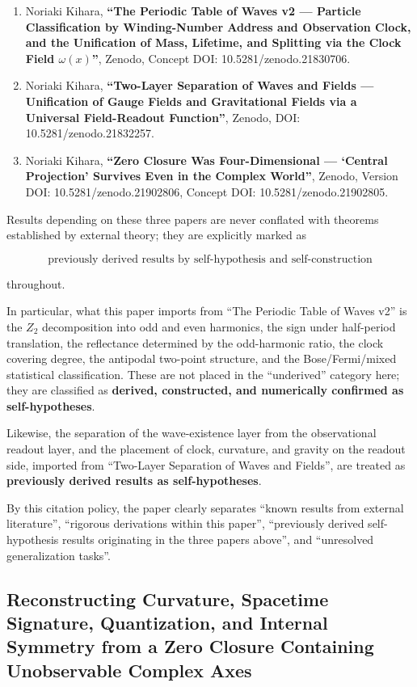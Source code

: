 \documentclass[
  a4paper,
]{article}
\providecommand{\tightlist}{%
  \setlength{\itemsep}{0pt}\setlength{\parskip}{0pt}}
\begin{document}
\begin{enumerate}
\def\labelenumi{\arabic{enumi}.}
\tightlist
\item
  Noriaki Kihara, \textbf{``The Periodic Table of Waves v2 --- Particle
  Classification by Winding-Number Address and Observation Clock, and
  the Unification of Mass, Lifetime, and Splitting via the Clock Field
  \(\omega(x)\)''}, Zenodo, Concept DOI: 10.5281/zenodo.21830706.
\item
  Noriaki Kihara, \textbf{``Two-Layer Separation of Waves and Fields ---
  Unification of Gauge Fields and Gravitational Fields via a Universal
  Field-Readout Function''}, Zenodo, DOI: 10.5281/zenodo.21832257.
\item
  Noriaki Kihara, \textbf{``Zero Closure Was Four-Dimensional ---
  `Central Projection' Survives Even in the Complex World''}, Zenodo,
  Version DOI: 10.5281/zenodo.21902806, Concept DOI:
  10.5281/zenodo.21902805.
\end{enumerate}

Results depending on these three papers are never conflated with
theorems established by external theory; they are explicitly marked as

\[
\boxed{\text{previously derived results by self-hypothesis and self-construction}}
\]

throughout.

In particular, what this paper imports from ``The Periodic Table of
Waves v2'' is the \(Z_2\) decomposition into odd and even harmonics, the
sign under half-period translation, the reflectance determined by the
odd-harmonic ratio, the clock covering degree, the antipodal two-point
structure, and the Bose/Fermi/mixed statistical classification. These
are not placed in the ``underived'' category here; they are classified
as \textbf{derived, constructed, and numerically confirmed as
self-hypotheses}.

Likewise, the separation of the wave-existence layer from the
observational readout layer, and the placement of clock, curvature, and
gravity on the readout side, imported from ``Two-Layer Separation of
Waves and Fields'', are treated as \textbf{previously derived results as
self-hypotheses}.

By this citation policy, the paper clearly separates ``known results
from external literature'', ``rigorous derivations within this paper'',
``previously derived self-hypothesis results originating in the three
papers above'', and ``unresolved generalization tasks''.

\subsection{Reconstructing Curvature, Spacetime Signature, Quantization,
and Internal Symmetry from a Zero Closure Containing Unobservable
Complex
Axes}\label{reconstructing-curvature-spacetime-signature-quantization-and-internal-symmetry-from-a-zero-closure-containing-unobservable-complex-axes}
\end{document}
